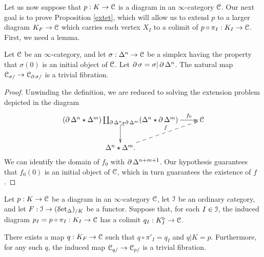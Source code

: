 Let us now suppose that $p: K \rightarrow \operatorname{\mathcal{C}}$ is a diagram in an $\infty$-category $\operatorname{\mathcal{C}}$. Our next goal is to prove Proposition \ref{extet}, which will allow us to extend $p$ to a larger diagram $K_{F} \rightarrow \operatorname{\mathcal{C}}$ which carries each vertex $X_I$ to a colimit of $p \circ \pi_I: K_I \rightarrow \operatorname{\mathcal{C}}$. First, we need a lemma.

\begin{lemma}\label{chort}
Let $\operatorname{\mathcal{C}}$ be an $\infty$-category, and let
$\sigma: \Delta^n \rightarrow \operatorname{\mathcal{C}}$ be a simplex having the property that
$\sigma(0)$ is an initial object of $\operatorname{\mathcal{C}}$. Let $\operatorname{\partial} \sigma = \sigma | \operatorname{\partial} \Delta^n$. 
The natural map $\operatorname{\mathcal{C}}_{\sigma/} \rightarrow \operatorname{\mathcal{C}}_{\operatorname{\partial} \sigma/}$ is a trivial fibration.
\end{lemma}

\begin{proof}
Unwinding the definition, we are reduced to solving the extension problem depicted in the diagram
$$ \xymatrix{ (\bd \Delta^n \star \Delta^m) \coprod_{
\bd \Delta^n \star \bd \Delta^m } (\Delta^n \star \bd \Delta^m) \ar[r]^-{f_0} 
\ar@{^{(}->}[d] & \calC \\
\Delta^n \star \Delta^m. \ar@{-->}[ur]^-{f} & }$$
We can identify the domain of $f_0$ with $\operatorname{\partial} \Delta^{n+m+1}$. Our hypothesis
guarantees that $f_0(0)$ is an initial object of $\operatorname{\mathcal{C}}$, which in turn guarantees the existence of $f$.
\end{proof}

\begin{proposition}\label{extet}
Let $p: K \rightarrow \operatorname{\mathcal{C}}$ be a diagram in an $\infty$-category $\operatorname{\mathcal{C}}$, let $\operatorname{\mathcal{I}}$ be an ordinary category, and let $F: \operatorname{\mathcal{I}} \rightarrow (\operatorname{\mathcal{S}et_{\Delta}})_{/K}$ be a functor. Suppose that, for each $I \in \operatorname{\mathcal{I}}$, the induced diagram $p_I = p \circ \pi_I: K_I \rightarrow \operatorname{\mathcal{C}}$ has a colimit
$q_I: K_I^{\triangleright} \rightarrow \operatorname{\mathcal{C}}$.

There exists a map $q: K_F \rightarrow \operatorname{\mathcal{C}}$ such that $q \circ \pi'_I = q_{I}$ and $q|K = p$. 
Furthermore, for any such $q$, the induced map $\operatorname{\mathcal{C}}_{q/} \rightarrow \operatorname{\mathcal{C}}_{p/}$ is a trivial fibration.
\end{proposition}

